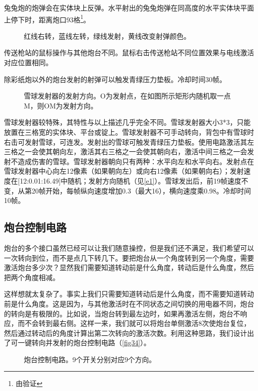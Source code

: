 兔兔炮的炮弹会在实体块上反弹。水平射出的兔兔炮弹在同高度的水平实体块平面上停下时，距离炮口93格\footnote{由验证}。

\begin{figure}[!ht]
\centering
{}
\caption{红线右转，蓝线左转，绿线发射，黄线改变射弹颜色。}
\label{i215}
\end{figure}

传送枪站的鼠标操作与其他炮台不同。鼠标右击传送枪站不同位置效果与电线激活对应位置相同。

除彩纸炮以外的炮台发射的射弹可以触发青绿压力垫板。冷却时间30帧。

\begin{figure}[!ht]
\centering
{}
\caption{雪球发射器的发射方向。O为发射点，在如图所示矩形内随机取一点M，则OM为发射方向。}\label{e1}
\end{figure}
雪球发射器较特殊，其特性与以上描述几乎完全不同。雪球发射器大小3*3，只能放置在三格宽的实体块、平台或锭上。雪球发射器不可手动转向，背包中有雪球时右击可发射雪球，可连发。发射出的雪球可触发青绿压力垫板。使用电路激活其左三格之一会使其朝向左，激活其右三格之一会使其朝向右，激活中间三格之一会发射不造成伤害的雪球。雪球发射器朝向只有两种：水平向左和水平向右。发射点在雪球发射器中心向左12像素（如果朝向左）或向右12像素（如果朝向右）；发射速度在[12:0.01:16.49]中随机；发射方向随机（见\autoref{e1}）。雪球发出后，前19帧速度不变，从第20帧开始，每帧纵向速度增加0.3（最大16），横向速度乘0.98。冷却时间10帧。

\subsection{炮台控制电路}
炮台的多个接口虽然已经可以让我们随意操控，但是我们还不满足，我们希望可以一次转向到位，而不是点几下转几下。要把炮台从一个角度转到另一个角度，需要激活炮台多少次？显然我们需要知道转动前是什么角度，转动后是什么角度，然后把两个角度相减。

这样想就太复杂了。事实上我们只需要知道转动后是什么角度，而不需要知道转动前是什么角度。这是因为，与其他激活时在不同状态之间切换的用电器不同，炮台的转向是有极限的。比如说，当炮台转到最左边时，如果再激活左侧，炮台不响应，而不会转到最右侧。这样一来，我们就可以将炮台单侧激活8次使炮台复位，然后通过转动后的角度计算出第二次转向的激活次数。利用这种思路，我们设计出了可一键转向并发射的炮台控制电路（\autoref{fig34}）。

\begin{figure}[!ht]
\centering
{}%
%
\caption{炮台控制电路。9个开关分别对应9个方向。}\label{fig34}
\end{figure}

